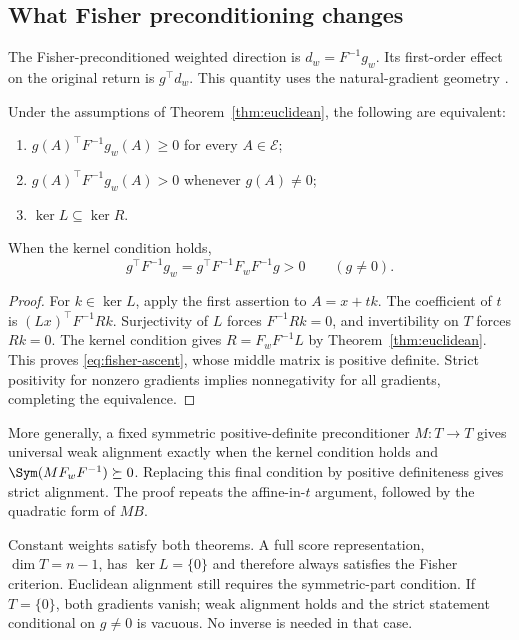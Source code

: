 \subsection{What Fisher preconditioning changes}

The Fisher-preconditioned weighted direction is $d_w=F^{-1}g_w$. Its first-order effect on the original return is $g^\top d_w$. This quantity uses the natural-gradient geometry \cite{kakade}.

\begin{theorem}
\label{thm:fisher}
Under the assumptions of Theorem~\ref{thm:euclidean}, the following are equivalent:
\begin{enumerate}
\item $g(A)^\top F^{-1}g_w(A)\ge0$ for every $A\in\mathcal E$;
\item $g(A)^\top F^{-1}g_w(A)>0$ whenever $g(A)\ne0$;
\item $\ker L\subseteq\ker R$.
\end{enumerate}
When the kernel condition holds,
\begin{equation}
g^\top F^{-1}g_w=g^\top F^{-1}F_wF^{-1}g>0\qquad(g\ne0).
\label{eq:fisher-ascent}
\end{equation}
\end{theorem}

\begin{proof}
For $k\in\ker L$, apply the first assertion to $A=x+tk$. The coefficient of $t$ is $(Lx)^\top F^{-1}Rk$. Surjectivity of $L$ forces $F^{-1}Rk=0$, and invertibility on $T$ forces $Rk=0$. The kernel condition gives $R=F_wF^{-1}L$ by Theorem~\ref{thm:euclidean}. This proves \eqref{eq:fisher-ascent}, whose middle matrix is positive definite. Strict positivity for nonzero gradients implies nonnegativity for all gradients, completing the equivalence.
\end{proof}

More generally, a fixed symmetric positive-definite preconditioner $M:T\to T$ gives universal weak alignment exactly when the kernel condition holds and $\Sym(MF_wF^{-1})\succeq0$. Replacing this final condition by positive definiteness gives strict alignment. The proof repeats the affine-in-$t$ argument, followed by the quadratic form of $MB$.

Constant weights satisfy both theorems. A full score representation, $\dim T=n-1$, has $\ker L=\{0\}$ and therefore always satisfies the Fisher criterion. Euclidean alignment still requires the symmetric-part condition. If $T=\{0\}$, both gradients vanish; weak alignment holds and the strict statement conditional on $g\ne0$ is vacuous. No inverse is needed in that case.

